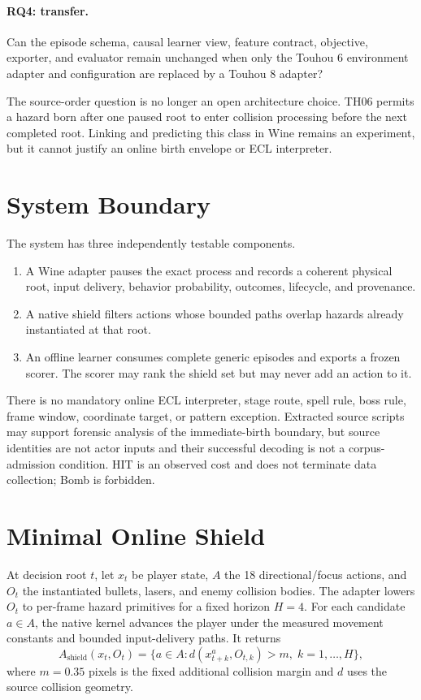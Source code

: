 \documentclass[11pt]{article}
\begin{document}
\paragraph{RQ4: transfer.}
Can the episode schema, causal learner view, feature contract, objective,
exporter, and evaluator remain unchanged when only the Touhou 6 environment
adapter and configuration are replaced by a Touhou 8 adapter?

The source-order question is no longer an open architecture choice.  TH06
permits a hazard born after one paused root to enter collision processing before
the next completed root.  Linking and predicting this class in Wine remains an
experiment, but it cannot justify an online birth envelope or ECL interpreter.

\section{System Boundary}

The system has three independently testable components.

\begin{enumerate}
  \item A Wine adapter pauses the exact process and records a coherent physical
        root, input delivery, behavior probability, outcomes, lifecycle, and
        provenance.
  \item A native shield filters actions whose bounded paths overlap hazards
        already instantiated at that root.
  \item An offline learner consumes complete generic episodes and exports a
        frozen scorer.  The scorer may rank the shield set but may never add an
        action to it.
\end{enumerate}

There is no mandatory online ECL interpreter, stage route, spell rule, boss
rule, frame window, coordinate target, or pattern exception.  Extracted source
scripts may support forensic analysis of the immediate-birth boundary, but
source identities are not actor inputs and their successful decoding is not a
corpus-admission condition.  HIT is an observed cost and does not terminate
data collection; Bomb is forbidden.

\section{Minimal Online Shield}

At decision root $t$, let $x_t$ be player state, $A$ the 18 directional/focus
actions, and $O_t$ the instantiated bullets, lasers, and enemy collision
bodies.  The adapter lowers $O_t$ to per-frame hazard primitives for a fixed
horizon $H=4$.  For each candidate $a\in A$, the native kernel advances the
player under the measured movement constants and bounded input-delivery paths.
It returns
\begin{equation}
  A_{\mathrm{shield}}(x_t,O_t)
  = \{a\in A : d(x_{t+k}^{a}, O_{t,k}) > m,
                \; k=1,\ldots,H\},
\end{equation}
where $m=0.35$ pixels is the fixed additional collision margin and $d$ uses
the source collision geometry.
\end{document}
